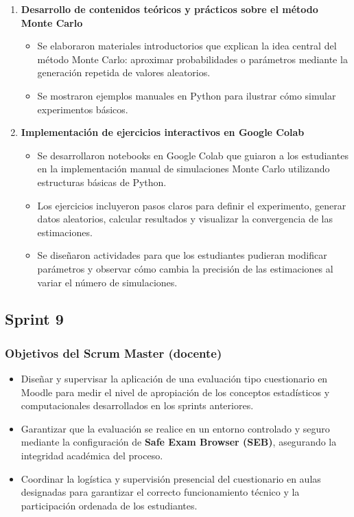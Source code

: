 \documentclass[letter,oneside,12pt,spanish]{report}
\begin{document}
\begin{enumerate}
	\item \textbf{Desarrollo de contenidos teóricos y prácticos sobre el método Monte Carlo}  
	\begin{itemize}
		\item Se elaboraron materiales introductorios que explican la idea central del método Monte Carlo: aproximar probabilidades o parámetros mediante la generación repetida de valores aleatorios.
		\item Se mostraron ejemplos manuales en Python para ilustrar cómo simular experimentos básicos.
	\end{itemize}
	
	\item \textbf{Implementación de ejercicios interactivos en Google Colab}  
	\begin{itemize}
		\item Se desarrollaron notebooks en Google Colab que guiaron a los estudiantes en la implementación manual de simulaciones Monte Carlo utilizando estructuras básicas de Python.
		\item Los ejercicios incluyeron pasos claros para definir el experimento, generar datos aleatorios, calcular resultados y visualizar la convergencia de las estimaciones.
		\item Se diseñaron actividades para que los estudiantes pudieran modificar parámetros y observar cómo cambia la precisión de las estimaciones al variar el número de simulaciones.
	\end{itemize}
\end{enumerate}

\subsection{Sprint 9}

\subsubsection*{Objetivos del Scrum Master (docente)}
\begin{itemize}
	\item Diseñar y supervisar la aplicación de una evaluación tipo cuestionario en Moodle para medir el nivel de apropiación de los conceptos estadísticos y computacionales desarrollados en los sprints anteriores.
	\item Garantizar que la evaluación se realice en un entorno controlado y seguro mediante la configuración de \textbf{Safe Exam Browser (SEB)}, asegurando la integridad académica del proceso.
	\item Coordinar la logística y supervisión presencial del cuestionario en aulas designadas para garantizar el correcto funcionamiento técnico y la participación ordenada de los estudiantes.
\end{itemize}
\end{document}

